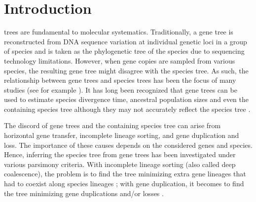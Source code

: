 \documentclass[9.5pt,journal,letterpaper,compsoc]{IEEEtran}
\begin{document}
\IEEEdisplaynotcompsoctitleabstractindextext
\IEEEpeerreviewmaketitle

\section{Introduction}
 trees are fundamental to molecular
systematics. Traditionally, a gene tree is reconstructed from  DNA
sequence variation at individual genetic loci in a group of species
and is taken as the phylogenetic tree of the species due to
sequencing technology limitations. However,  when gene copies are
sampled from various species, the resulting gene tree might disagree
with the species tree.  As such, the relationship between gene trees
and species trees has been the focus of many studies (see for
example \cite{Doyle_SysBot_92, Goodman_SysZool_79,
Maddison_SysBiol_97, Page_SysBiol_94, PN88, T89, Wu91}). It has long
been recognized that gene trees can be used to estimate species
divergence time, ancestral population sizes and
 even the containing species tree although they
 may not accurately
reflect the species tree \cite{Edwards_Evolution_00,
Hey_Genetics_04, Maddison_SysBiol_06}.

The discord of gene trees and the containing species tree can arise
from horizontal gene transfer, incomplete lineage sorting, and gene
duplication and loss. The importance of these causes depends on the
considered  genes and species. Hence, inferring the species tree
from gene trees has been investigated under various parsimony
criteria. With incomplete lineage sorting (also called deep
coalescence), the problem is to find the tree minimizing
 extra gene lineages that had to coexist along species
lineages \cite{Maddison_SysBiol_97}; with gene duplication, it becomes
to find the tree minimizing gene duplications and/or losses
\cite{Goodman_SysZool_79, Page_SysBiol_94, Guigo_MPE_96,Ronquist_ZoolScr_97}.
\end{document}
